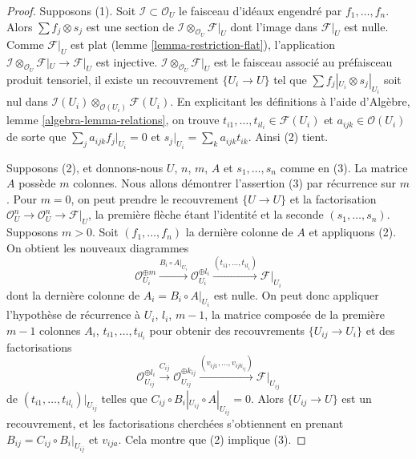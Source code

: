 \begin{proof}

Supposons (1). Soit $\mathcal{I} \subset \mathcal{O}_U$ le faisceau
d'idéaux engendré par $f_1, \ldots, f_n$. Alors
$\sum f_j \otimes s_j$ est une section de
$\mathcal{I} \otimes_{\mathcal{O}_U} \mathcal{F}|_U$
dont l'image dans $\mathcal{F}|_U$ est nulle. Comme $\mathcal{F}|_U$ est
plat (lemme \ref{lemma-restriction-flat}), l'application
$\mathcal{I} \otimes_{\mathcal{O}_U} \mathcal{F}|_U \to \mathcal{F}|_U$
est injective. $\mathcal{I} \otimes_{\mathcal{O}_U} \mathcal{F}|_U$
est le faisceau associé au préfaisceau produit tensoriel, il existe un
recouvrement $\{U_i \to U\}$ tel que
$\sum f_j|_{U_i} \otimes s_j|_{U_i}$ soit nul dans
$\mathcal{I}(U_i) \otimes_{\mathcal{O}(U_i)} \mathcal{F}(U_i)$. En
explicitant les définitions à l'aide d'Algèbre, lemme
\ref{algebra-lemma-relations}, on trouve
$t_{i1}, \ldots, t_{i l_i} \in \mathcal{F}(U_i)$ et
$a_{ijk} \in \mathcal{O}(U_i)$
de sorte que $\sum_j a_{ijk}f_j|_{U_i} = 0$ et
$s_j|_{U_i} = \sum_k a_{ijk}t_{ik}$. Ainsi (2) tient.

\medskip\noindent

Supposons (2), et donnons-nous $U$, $n$, $m$, $A$ et
$s_1, \ldots, s_n$ comme en (3). La matrice $A$ possède $m$ colonnes.
Nous allons démontrer l'assertion (3) par récurrence sur $m$. Pour
$m = 0$, on peut prendre le recouvrement $\{U \to U\}$ et la factorisation
$\mathcal{O}_U^n \to \mathcal{O}_U^n \to \mathcal{F}|_U$, la première
flèche étant l'identité et la seconde $(s_1, \ldots, s_n)$. Supposons
$m > 0$. Soit $(f_1, \ldots, f_n)$ la dernière colonne de $A$ et appliquons
(2). On obtient les nouveaux diagrammes
$$
\mathcal{O}_{U_i}^{\oplus m} \xrightarrow{B_i \circ A|_{U_i}}
\mathcal{O}_{U_i}^{\oplus l_i} \xrightarrow{(t_{i1}, \ldots, t_{il_i})}
\mathcal{F}|_{U_i}
$$
dont la dernière colonne de $A_i = B_i \circ A|_{U_i}$ est nulle.
On peut donc appliquer l'hypothèse de récurrence à
$U_i$, $l_i$, $m - 1$, la matrice composée de la première $m - 1$ colonnes $A_i$, $t_{i1}, \ldots, t_{il_i}$
pour obtenir des recouvrements $\{U_{ij} \to U_i\}$ et des factorisations
$$
\mathcal{O}_{U_{ij}}^{\oplus l_i}
\xrightarrow{C_{ij}}
\mathcal{O}_{U_{ij}}^{\oplus k_{ij}}
\xrightarrow{(v_{ij1}, \ldots, v_{ij k_{ij}})}
\mathcal{F}|_{U_{ij}}
$$
de $(t_{i1}, \ldots, t_{il_i})|_{U_{ij}}$ telles que
$C_{ij} \circ B_i|_{U_{ij}} \circ A|_{U_{ij}} = 0$. Alors
$\{U_{ij} \to U\}$ est un recouvrement, et les factorisations cherchées
s'obtiennent en prenant $B_{ij} = C_{ij} \circ B_i|_{U_{ij}}$ et
$v_{ija}$. Cela montre que (2) implique (3).


\end{proof}
